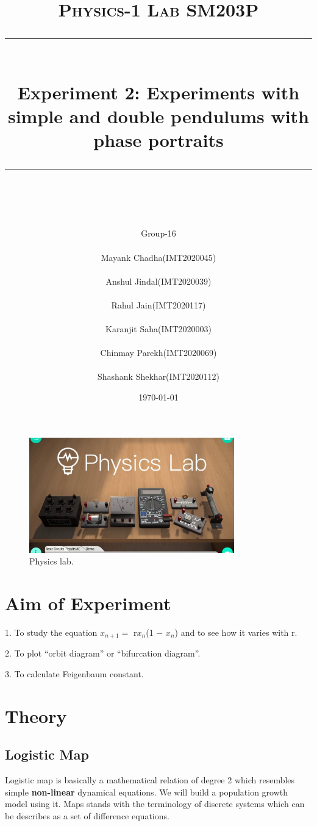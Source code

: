 \documentclass[11pt]{scrartcl} %
\title{	
	\normalfont\normalsize
	\textsc{\Huge Physics-1 Lab SM203P}\\ %
	\vspace{25pt} %
	\rule{\linewidth}{0.5pt}\\ %
	\vspace{20pt} %
	{\huge Experiment 2: Experiments with simple and double pendulums with phase portraits}\\ %
	\vspace{12pt} %
	\rule{\linewidth}{2pt}\\ %
	\vspace{12pt} %
}
\author{\Huge Group-16\\
\\
\LARGE Mayank Chadha(IMT2020045)\\
\\
\LARGE Anshul Jindal(IMT2020039)\\
\\
\LARGE Rahul Jain(IMT2020117)\\
\\
\LARGE Karanjit Saha(IMT2020003)\\
\\
\LARGE Chinmay Parekh(IMT2020069)\\
\\
\LARGE Shashank Shekhar(IMT2020112)} %
\date{\normalsize\today} %
\begin{document}
\maketitle %

\begin{figure}[h] %
	\centering
	\includegraphics[width=\textwidth, height=5cm]{first.jpg} %
	\caption{Physics lab.}
\end{figure}

\section{Aim of Experiment}
1. To study the equation $x_{n+1} =$ r$x_n$(1 − $x_n$) and to see how it varies with r.\par
2.  To plot “orbit diagram” or “bifurcation diagram”. \par
3. To calculate Feigenbaum constant.  \par





\section{Theory}


\subsection{Logistic Map}
Logistic map is basically a mathematical relation of degree 2 which resembles simple \textbf{non-linear} dynamical equations. We will build a population growth model using it. Maps stands with the terminology of discrete systems which can be describes as a set of difference equations.\par
\end{document}
